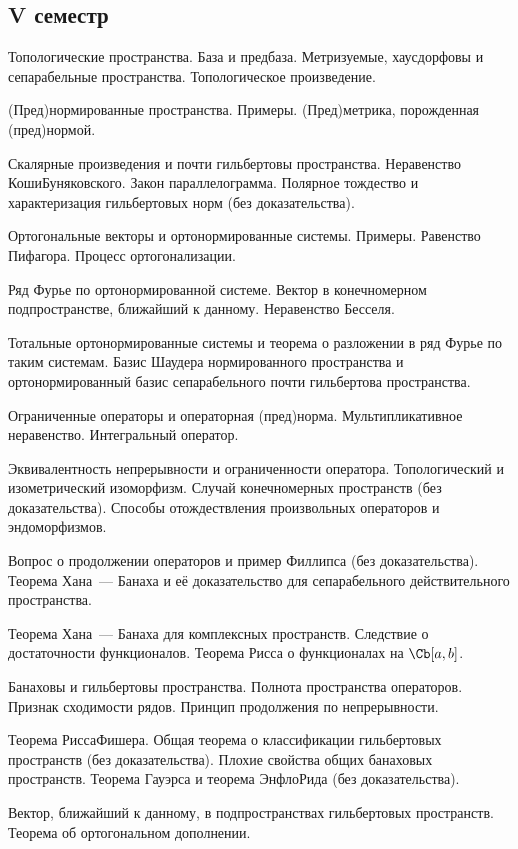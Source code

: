 \documentclass[a4paper]{article}
\begin{document}
\subsection*{V семестр}
\begin{nums}{-3}
\item Топологические пространства. База и предбаза. Метризуемые, хаусдорфовы и сепарабельные пространства.
Топологическое произведение.
\item (Пред)нормированные пространства. Примеры. (Пред)метрика, порожденная (пред)нормой.
\item Скалярные произведения и почти гильбертовы пространства. Неравенство Коши\ч Буняковского. Закон параллелограмма.
Полярное тождество и характеризация гильбертовых норм (без доказательства).
\item Ортогональные векторы и ортонормированные системы. Примеры. Равенство Пифагора. Процесс ортогонализации.
\item Ряд Фурье по ортонормированной системе. Вектор в конечномерном подпространстве, ближайший к данному.
Неравенство Бесселя.
\item Тотальные ортонормированные системы и теорема о разложении в ряд Фурье по таким системам.
Базис Шаудера нормированного пространства и ортонормированный базис сепарабельного почти гильбертова пространства.
\item Ограниченные операторы и операторная (пред)норма. Мультипликативное неравенство. Интегральный оператор.
\item Эквивалентность непрерывности и ограниченности оператора. Топологический и изометрический изоморфизм.
Случай конечномерных пространств (без доказательства). Способы отождествления произвольных операторов и эндоморфизмов.
\item Вопрос о продолжении операторов и пример Филлипса (без доказательства). Теорема Хана~--- Банаха и её
доказательство для сепарабельного действительного пространства.
\item Теорема Хана~--- Банаха для комплексных пространств. Следствие о достаточности функционалов. Теорема
Рисса о функционалах на $\Cb[a,b]$.
\item Банаховы и гильбертовы пространства. Полнота пространства операторов. Признак сходимости рядов.
Принцип продолжения по непрерывности.
\item Теорема Рисса\ч Фишера. Общая теорема о классификации гильбертовых пространств (без доказательства).
Плохие свойства общих банаховых пространств. Теорема Гауэрса и теорема Энфло\ч Рида (без доказательства).
\item Вектор, ближайший к данному, в подпространствах гильбертовых пространств. Теорема об ортогональном дополнении.

\end{nums}
\end{document}
